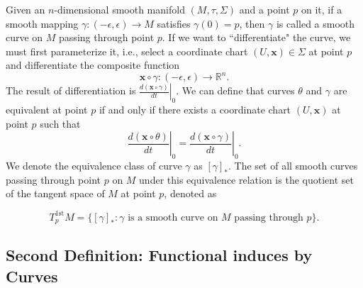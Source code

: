 \documentclass{report}
\begin{document}
Given an $n$-dimensional smooth manifold $(M,\tau,\Sigma)$ and a point $p$ on it, if a smooth mapping $\gamma:(-\epsilon,\epsilon)\to M$ satisfies $\gamma(0)=p$, then $\gamma$ is called a smooth curve on $M$ passing through point $p$. If we want to ``differentiate" the curve, we must first parameterize it, i.e., select a coordinate chart $(U,\mathbf{x})\in\Sigma$ at point $p$ and differentiate the composite function
\[
    \mathbf{x} \circ \gamma:(-\epsilon,\epsilon)\longrightarrow\mathbb{R}^n.
\]
The result of differentiation is $\left.\frac{d(\mathbf{x} \circ \gamma)}{dt}\right|_0$. 
We can define that curves $\theta$ and $\gamma$ are equivalent at point $p$ if and only if there exists a coordinate chart $(U,\mathbf{x})$ at point $p$ such that
\[
    \left.\frac{d(\mathbf{x} \circ \theta)}{dt}\right|_0=\left.\frac{d(\mathbf{x} \circ \gamma)}{dt}\right|_0.
\]
We denote the equivalence class of curve $\gamma$ as $[\gamma]_*$. The set of all smooth curves passing through point $p$ on $M$ under this equivalence relation is the quotient set of the tangent space of $M$ at point $p$, denoted as

\[
    T_p^{1\mathrm{st}}M = \{[\gamma]_*: \gamma \text{ is a smooth curve on } M \text{ passing through } p\}.
\]

\subsection{Second Definition: Functional induces by Curves}
\end{document}
